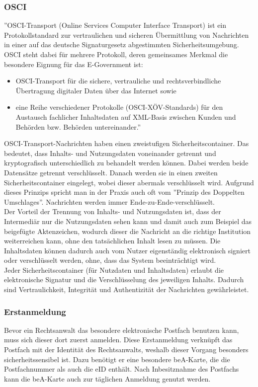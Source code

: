 \subsubsection{OSCI}
\label{sec:bea:sicherheit:osci}
''OSCI-Transport (Online Services Computer Interface Transport) ist ein Protokollstandard zur vertraulichen und sicheren Übermittlung von Nachrichten in einer auf das deutsche Signaturgesetz abgestimmten Sicherheitsumgebung. OSCI steht dabei für mehrere Protokoll, deren gemeinsames Merkmal die besondere Eignung für das E-Government ist:
\begin{itemize}
	\item OSCI-Transport für die sichere, vertrauliche und rechtsverbindliche Übertragung digitaler Daten über das Internet sowie
	\item eine Reihe verschiedener Protokolle (OSCI-XÖV-Standards) für den Austausch fachlicher Inhaltsdaten auf XML-Basis zwischen Kunden und Behörden bzw. Behörden untereinander.'' \textcite{bea:osci}
\end{itemize}

OSCI-Transport-Nachrichten haben einen zweistufigen Sicherheitscontainer. Das bedeutet, dass Inhalts- und Nutzungsdaten voneinander getrennt und kryptografisch unterschiedlich zu behandelt werden können. Dabei werden beide Datensätze getrennt verschlüsselt. Danach werden sie in einen zweiten Sicherheitscontainer eingelegt, wobei dieser abermals verschlüsselt wird. Aufgrund dieses Prinzips spricht man in der Praxis auch oft vom ''Prinzip des Doppelten Umschlages''. Nachrichten werden immer Ende-zu-Ende-verschlüsselt. \\
Der Vorteil der Trennung von Inhalts- und Nutzungsdaten ist, dass der Intermediär nur die Nutzungsdaten sehen kann und damit auch zum Beispiel das beigefügte Aktenzeichen, wodurch dieser die Nachricht an die richtige Institution weiterreichen kann, ohne den tatsächlichen Inhalt lesen zu müssen. Die Inhaltsdaten können dadurch auch vom Nutzer eigenständig elektronisch signiert oder verschlüsselt werden, ohne, dass das System beeinträchtigt wird. \\
Jeder Sicherheitscontainer (für Nutzdaten und Inhaltsdaten) erlaubt die elektronische Signatur und die Verschlüsselung des jeweiligen Inhalts. Dadurch sind Vertraulichkeit, Integrität und Authentizität der Nachrichten gewährleistet. \textcite{bea:osci}

\subsubsection{Erstanmeldung}
Bevor ein Rechtsanwalt das besondere elektronische Postfach benutzen kann, muss sich dieser dort zuerst anmelden. Diese Erstanmeldung verknüpft das Postfach mit der Identität des Rechtsanwalts, weshalb dieser Vorgang besonders sicherheitssensibel ist. Dazu benötigt er eine besondere beA-Karte, die die Postfachnummer als auch die eID enthält. Nach Inbesitznahme des Postfachs kann die beA-Karte auch zur täglichen Anmeldung genutzt werden.

